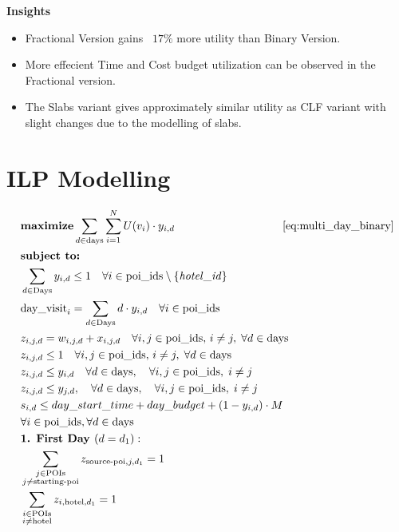 \documentclass[sigconf,authordraft]{acmart}
\begin{document}
\noindent \textbf{Insights}
\begin{itemize}
    \item Fractional Version gains ~$17\%$ more utility than Binary Version.
    \item More effecient Time and Cost budget utilization can be observed in the Fractional version.
    \item The Slabs variant gives approximately similar utility as CLF variant with slight changes due to the modelling of slabs.
\end{itemize}

\section{ILP Modelling}
\begin{align}
    & \textbf{maximize} \sum_{d \in \text{days}} \sum_{i = 1}^{N} U(v_i) \cdot y_{i,d} \hspace{3.4cm} \ref{eq:multi_day_binary} \notag\\
    & \textbf{subject to:} \notag \\ 
    & \sum_{d \in \text{Days}} y_{i,d} \leq 1 \quad \forall i \in \text{poi\_ids} \setminus \{\mathit{hotel\_id}\}\\
    & \text{day\_visit}_i = \sum_{d \in \text{Days}} d \cdot y_{i,d}\quad \forall i \in \text{poi\_ids} \\
    & z_{i,j,d} = w_{i,j,d} + x_{i,j,d} \quad\forall i, j \in \text{poi\_ids},\, i \ne j,\; \forall d \in \text{days} \\
    & z_{i,j,d} \leq 1 \quad \forall i, j \in \text{poi\_ids},\, i \ne j,\; \forall d \in \text{days} \\
    &  z_{i,j,d} \leq y_{i,d} \quad \forall d \in \text{days},\quad \forall i, j \in \text{poi\_ids},\; i \ne j\  \\
    &  z_{i,j,d} \leq y_{j,d}, \quad \forall d \in \text{days},\quad \forall i, j \in \text{poi\_ids},\; i \ne j\ \\   
    & s_{i,d} \leq day\_start\_time + day\_budget + (1 - y_{i,d}) \cdot M \notag\\
    &\forall i \in \text{poi\_ids}, \forall d \in \text{days}\  \\
    & \textbf{1. First Day } (d = d_1): \notag \\
    & \sum_{\substack{j \in \text{POIs} \\ j \neq \text{starting-poi}}} z_{\text{source-poi},j,d_1} = 1 \\
    & \sum_{\substack{i \in \text{POIs} \\ i \neq \text{hotel}}} z_{i,\text{hotel},d_1} = 1  \\

\end{align}
\end{document}
